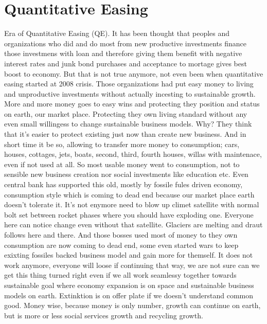 \section{Quantitative Easing}
Era of Quantitative Easing (QE). It has been thought that peoples and organizations who did and do most from new productive investments finance those investmens with loan and therefore giving them benefit with negative interest rates and junk bond purchases and acceptance to mortage gives best boost to economy. But that is not true anymore, not even been when quantitative easing started at 2008 crisis. Those organizations had put easy money to living and unproductive investments without actually incesting to sustainable growth. More and more money goes to easy wins and protecting they position and status on earth, our market place. Protecting they own living standard without any even small willingess to change sustainable business models. Why? They think that it's easier to protect existing just now than create new business. And in short time it be so, allowing to transfer more money to consumption; cars, houses, cottages, jets, boats, second, third, fourth houses, willas with maintenace, even if not used at all. So most usable money went to consumption, not to sensible new business creation nor social investments like education etc. Even central bank has supported this old, mostly by fossile fules driven economy, consumption style which is coming to dead end because our market place earth doesn't tolerate it. It's not enymore need to blow up climet satellite with normal bolt set between rocket phases where you should have exploding one. Everyone here can notice change even without that satellite. Glaciers are melting and draut follows here and there. And those bosses used most of money to they own consumption are now coming to dead end, some even started wars to keep exixting fossiles backed business model and gain more for themself. It does not work anymore, everyone will loose if continuing that way, we are not sure can we get this thing turned right even if we all work seamlessy together towards sustainable goal where economy expansion is on space and sustainable business models on earth. Extinktion is on offer plate if we doesn't understand common good. Money wise, because money is only number, growth can continue on earth, but is more or less social services growth and recycling growth.

